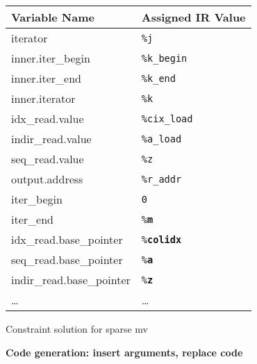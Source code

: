 {\centering
\footnotesize 
\begin{tabular}{l|l}
\textbf{Variable Name} & \textbf{Assigned IR Value}\\
\hline
iterator                    & \texttt{\%j}\\
inner.iter\_begin           & \texttt{\%k\_begin}\\
inner.iter\_end             & \texttt{\%k\_end}\\
inner.iterator              & \texttt{\%k}\\
idx\_read.value             & \texttt{\%cix\_load}\\
indir\_read.value           & \texttt{\%a\_load}\\
seq\_read.value             & \texttt{\%z}\\
output.address              & \texttt{\%r\_addr}\\
iter\_begin                 & \texttt{0}\\
iter\_end                   & \texttt{\%\bf m}\\
idx\_read.base\_pointer     & \texttt{\%\bf colidx}\\
seq\_read.base\_pointer     & \texttt{\%\bf a}\\
indir\_read.base\_pointer   & \texttt{\%\bf z}\\
\dots                       & \dots\vspace{-0.5mm}\\
\end{tabular}

}

\caption{Constraint solution for sparse mv}
\label{fig:spmvexample2}

\centering
\vspace{0.0em}
{\centering
\begin{minipage}{0.05\linewidth}
\vspace{0pt}
\centering
{}
\end{minipage}
\begin{minipage}{\linewidth}
\centering
\textbf{Code generation: insert arguments, replace code}
\end{minipage}
\begin{minipage}{0.05\linewidth}
\vspace{0pt}
\centering
{}
\end{minipage}
}


